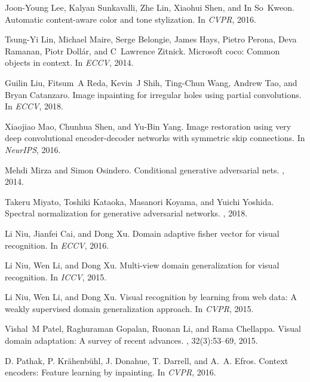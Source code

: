 \documentclass[10pt,twocolumn,letterpaper]{article}
\begin{document}
\begin{thebibliography}{10}
Joon-Young Lee, Kalyan Sunkavalli, Zhe Lin, Xiaohui Shen, and In So~Kweon.
\newblock Automatic content-aware color and tone stylization.
\newblock In {\em CVPR}, 2016.

Tsung-Yi Lin, Michael Maire, Serge Belongie, James Hays, Pietro Perona, Deva
  Ramanan, Piotr Doll{\'a}r, and C~Lawrence Zitnick.
\newblock Microsoft coco: Common objects in context.
\newblock In {\em ECCV}, 2014.

Guilin Liu, Fitsum~A Reda, Kevin~J Shih, Ting-Chun Wang, Andrew Tao, and Bryan
  Catanzaro.
\newblock Image inpainting for irregular holes using partial convolutions.
\newblock In {\em ECCV}, 2018.

Xiaojiao Mao, Chunhua Shen, and Yu-Bin Yang.
\newblock Image restoration using very deep convolutional encoder-decoder
  networks with symmetric skip connections.
\newblock In {\em NeurIPS}, 2016.

Mehdi Mirza and Simon Osindero.
\newblock Conditional generative adversarial nets.
, 2014.

Takeru Miyato, Toshiki Kataoka, Masanori Koyama, and Yuichi Yoshida.
\newblock Spectral normalization for generative adversarial networks.
, 2018.

Li Niu, Jianfei Cai, and Dong Xu.
\newblock Domain adaptive fisher vector for visual recognition.
\newblock In {\em ECCV}, 2016.

Li Niu, Wen Li, and Dong Xu.
\newblock Multi-view domain generalization for visual recognition.
\newblock In {\em ICCV}, 2015.

Li Niu, Wen Li, and Dong Xu.
\newblock Visual recognition by learning from web data: {A} weakly supervised
  domain generalization approach.
\newblock In {\em CVPR}, 2015.

Vishal~M Patel, Raghuraman Gopalan, Ruonan Li, and Rama Chellappa.
\newblock Visual domain adaptation: A survey of recent advances.
, 32(3):53--69, 2015.

D. {Pathak}, P. {Krähenbühl}, J. {Donahue}, T. {Darrell}, and A.~A. {Efros}.
\newblock Context encoders: Feature learning by inpainting.
\newblock In {\em CVPR}, 2016.


\end{thebibliography}
\end{document}

